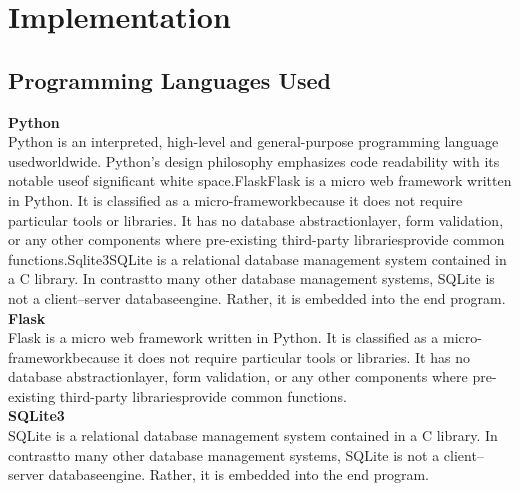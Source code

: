 \documentclass[12pt,a4paper]{report}
\begin{document}
\chapter{Implementation}
\section{Programming Languages Used}
\textbf{Python}\\
Python is an interpreted, high-level and general-purpose programming language usedworldwide. Python’s design philosophy emphasizes code readability with its notable useof significant white space.FlaskFlask is a micro web framework written in Python. It is classified as a micro-frameworkbecause it does not require particular tools or libraries. It has no database abstractionlayer, form validation, or any other components where pre-existing third-party librariesprovide common functions.Sqlite3SQLite is a relational database management system contained in a C library. In contrastto many other database management systems, SQLite is not a client–server databaseengine. Rather, it is embedded into the end program.\\
\linebreak
\textbf{Flask}\\
Flask is a micro web framework written in Python. It is classified as a micro-frameworkbecause it does not require particular tools or libraries. It has no database abstractionlayer, form validation, or any other components where pre-existing third-party librariesprovide common functions.\\
\linebreak
\textbf{SQLite3}\\
SQLite is a relational database management system contained in a C library. In contrastto many other database management systems, SQLite is not a client–server databaseengine. Rather, it is embedded into the end program.\\
\linebreak
\end{document}
